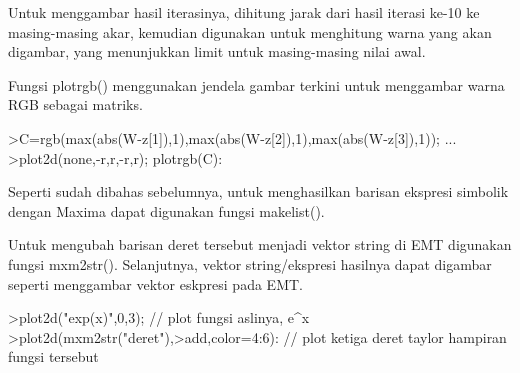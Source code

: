 \documentclass[a4paper,10pt]{article}
\begin{document}
\begin{eulernotebook}
\begin{eulercomment}
\begin{eulercomment}
\begin{eulercomment}
\begin{eulercomment}
\begin{eulercomment}
\begin{eulercomment}
\begin{eulercomment}
\begin{eulercomment}
\begin{eulercomment}
\begin{eulercomment}
\begin{eulercomment}
\begin{eulercomment}
\begin{eulercomment}
\begin{eulercomment}
\begin{eulercomment}
\begin{eulercomment}
\begin{eulercomment}
\begin{eulercomment}
\begin{eulercomment}
\begin{eulercomment}
\begin{eulercomment}
\begin{eulercomment}
\begin{eulercomment}
\begin{eulercomment}
\begin{eulercomment}
\begin{eulercomment}
\begin{eulercomment}
\begin{eulercomment}
\begin{eulercomment}
\begin{eulercomment}
\begin{eulercomment}
\begin{eulercomment}
\begin{eulercomment}
\begin{eulercomment}
\begin{eulercomment}
\begin{eulercomment}
\begin{eulercomment}
Untuk menggambar hasil iterasinya, dihitung jarak dari hasil iterasi
ke-10 ke masing-masing akar, kemudian digunakan untuk menghitung warna
yang akan digambar, yang menunjukkan limit untuk masing-masing nilai
awal. 

Fungsi plotrgb() menggunakan jendela gambar terkini untuk menggambar
warna RGB sebagai matriks.
\end{eulercomment}
\begin{eulerprompt}
>C=rgb(max(abs(W-z[1]),1),max(abs(W-z[2]),1),max(abs(W-z[3]),1)); ...
>plot2d(none,-r,r,-r,r); plotrgb(C):
\end{eulerprompt}
\begin{eulercomment}
\begin{eulercomment}
\begin{eulercomment}
Seperti sudah dibahas sebelumnya, untuk menghasilkan barisan ekspresi
simbolik dengan Maxima dapat digunakan fungsi makelist().
\end{eulercomment}
\begin{eulercomment}
Untuk mengubah barisan deret tersebut menjadi vektor string di EMT
digunakan fungsi mxm2str(). Selanjutnya, vektor string/ekspresi
hasilnya dapat digambar seperti menggambar vektor eskpresi pada EMT.
\end{eulercomment}
\begin{eulerprompt}
>plot2d("exp(x)",0,3); // plot fungsi aslinya, e^x
>plot2d(mxm2str("deret"),>add,color=4:6): // plot ketiga deret taylor hampiran fungsi tersebut
\end{eulerprompt}

\end{eulercomment}
\end{eulercomment}
\end{eulercomment}
\end{eulercomment}
\end{eulercomment}
\end{eulercomment}
\end{eulercomment}
\end{eulercomment}
\end{eulercomment}
\end{eulercomment}
\end{eulercomment}
\end{eulercomment}
\end{eulercomment}
\end{eulercomment}
\end{eulercomment}
\end{eulercomment}
\end{eulercomment}
\end{eulercomment}
\end{eulercomment}
\end{eulercomment}
\end{eulercomment}
\end{eulercomment}
\end{eulercomment}
\end{eulercomment}
\end{eulercomment}
\end{eulercomment}
\end{eulercomment}
\end{eulercomment}
\end{eulercomment}
\end{eulercomment}
\end{eulercomment}
\end{eulercomment}
\end{eulercomment}
\end{eulercomment}
\end{eulercomment}
\end{eulercomment}
\end{eulercomment}
\end{eulercomment}
\end{eulernotebook}
\end{document}
